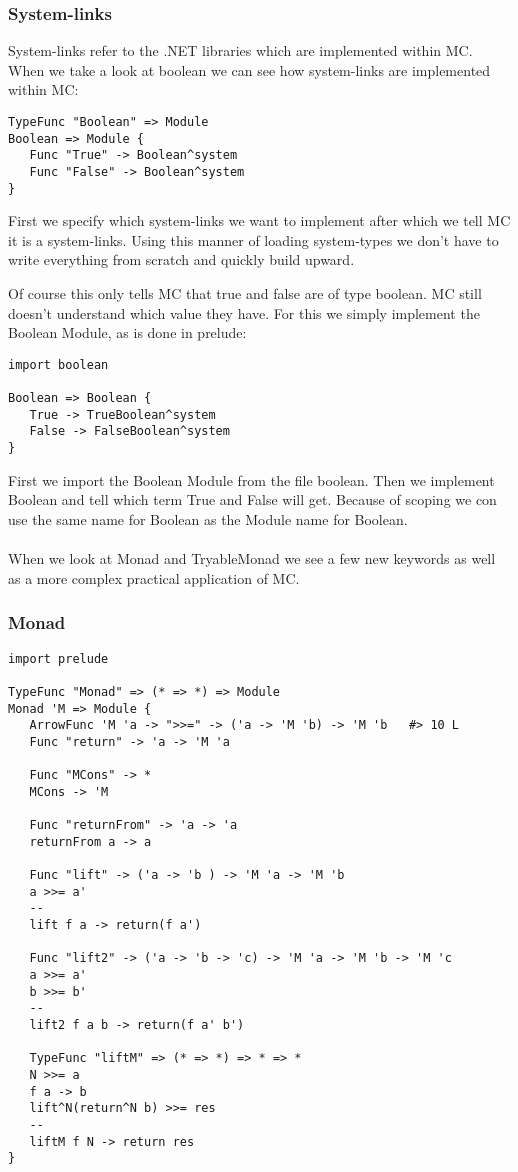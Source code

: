 \subsubsection{System-links}\label{sec:system}
System-links refer to the .NET libraries which are implemented within MC.
When we take a look at boolean we can see how system-links are implemented within MC:

\begin{lstlisting}
TypeFunc "Boolean" => Module
Boolean => Module {
   Func "True" -> Boolean^system
   Func "False" -> Boolean^system
}
\end{lstlisting}

First we specify which system-links we want to implement after which we tell MC it is a system-links.
Using this manner of loading system-types we don't have to write everything from scratch and quickly build upward.

Of course this only tells MC that true and false are of type boolean.
MC still doesn't understand which value they have.
For this we simply implement the Boolean Module, as is done in prelude:

\begin{lstlisting}
import boolean

Boolean => Boolean {
   True -> TrueBoolean^system
   False -> FalseBoolean^system
}
\end{lstlisting}

First we import the Boolean Module from the file boolean.
Then we implement Boolean and tell which term True and False will get.
Because of scoping we con use the same name for Boolean as the Module name for Boolean.

\paragraph{}
When we look at Monad and TryableMonad we see a few new keywords as well as a more complex practical application of MC.

\subsubsection{Monad}

\begin{lstlisting}
import prelude

TypeFunc "Monad" => (* => *) => Module
Monad 'M => Module {
   ArrowFunc 'M 'a -> ">>=" -> ('a -> 'M 'b) -> 'M 'b   #> 10 L
   Func "return" -> 'a -> 'M 'a

   Func "MCons" -> *
   MCons -> 'M

   Func "returnFrom" -> 'a -> 'a
   returnFrom a -> a

   Func "lift" -> ('a -> 'b ) -> 'M 'a -> 'M 'b
   a >>= a'
   --
   lift f a -> return(f a')

   Func "lift2" -> ('a -> 'b -> 'c) -> 'M 'a -> 'M 'b -> 'M 'c
   a >>= a'
   b >>= b'
   --
   lift2 f a b -> return(f a' b')

   TypeFunc "liftM" => (* => *) => * => *
   N >>= a
   f a -> b
   lift^N(return^N b) >>= res
   --
   liftM f N -> return res
}
\end{lstlisting}

